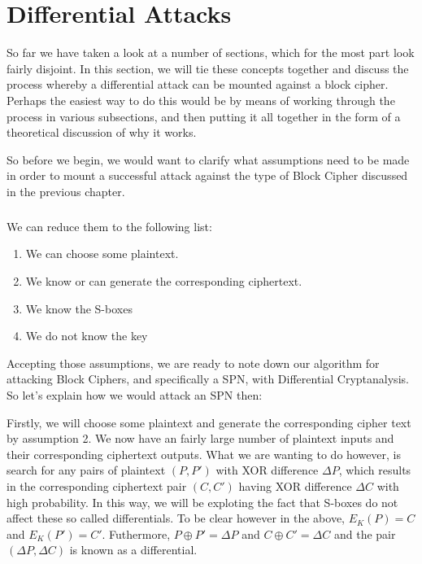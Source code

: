 



\chapter{Differential Attacks} \label{c:differential attacks}

So far we have taken a look at a number of sections, which for the most part
look fairly disjoint. In this section, we will tie these concepts together and
discuss the process whereby a differential attack can be mounted against a
block cipher. Perhaps the easiest way to do this would be by means of working
through the process in various subsections, and then putting it all together in
the form of a theoretical discussion of why it works.

So before we begin, we would want to clarify what assumptions need to be made
in order to mount a successful attack against the type of Block Cipher
discussed in the previous chapter.
\paragraph{}

We can reduce them to the following list:
\begin{enumerate}
\item We can choose some plaintext.
\item We know or can generate the corresponding ciphertext.
\item We know the S-boxes 
\item We do not know the key
\end{enumerate}

Accepting those assumptions, we are ready to note down our algorithm for
attacking Block Ciphers, and specifically a SPN, with Differential
Cryptanalysis.  So let's explain how we would attack an SPN then:

Firstly, we will choose some plaintext and generate the corresponding cipher
text by assumption 2. We now have an fairly large number of plaintext inputs
and their corresponding ciphertext outputs. What we are wanting to do however,
is search for any pairs of plaintext $(P, P')$ with XOR difference $\Delta P$,
which results in the corresponding ciphertext pair $(C, C')$ having XOR 
difference $\Delta C$ with high probability. In this way, we will be exploting
the fact that S-boxes do not affect these so called differentials. To be clear
however in the above, $E_K(P) = C$ and $E_K(P') = C'$. Futhermore, $P \oplus P'
= \Delta P$ and $C \oplus C' = \Delta C$ and the pair $(\Delta P, \Delta C)$ is
known as a differential.

